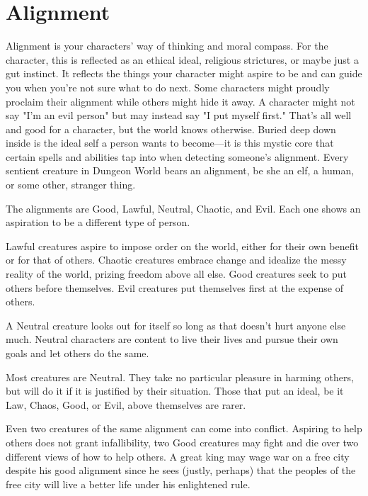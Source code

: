        
\section{Alignment}   
       

Alignment is your characters' way of thinking and moral compass. For the character, this is reflected as an ethical ideal, religious strictures, or maybe just a gut instinct. It reflects the things your character might aspire to be and can guide you when you're not sure what to do next. Some characters might proudly proclaim their alignment while others might hide it away. A character might not say "I'm an evil person" but may instead say "I put myself first." That's all well and good for a character, but the world knows otherwise. Buried deep down inside is the ideal self a person wants to become—it is this mystic core that certain spells and abilities tap into when detecting someone's alignment. Every sentient creature in Dungeon World bears an alignment, be she an elf, a human, or some other, stranger thing.

       

The alignments are Good, Lawful, Neutral, Chaotic, and Evil. Each one shows an aspiration to be a different type of person.

       

Lawful creatures aspire to impose order on the world, either for their own benefit or for that of others. Chaotic creatures embrace change and idealize the messy reality of the world, prizing freedom above all else. Good creatures seek to put others before themselves. Evil creatures put themselves first at the expense of others.

       

A Neutral creature looks out for itself so long as that doesn't hurt anyone else much. Neutral characters are content to live their lives and pursue their own goals and let others do the same.

       

Most creatures are Neutral. They take no particular pleasure in harming others, but will do it if it is justified by their situation. Those that put an ideal, be it Law, Chaos, Good, or Evil, above themselves are rarer.

       

Even two creatures of the same alignment can come into conflict. Aspiring to help others does not grant infallibility, two Good creatures may fight and die over two different views of how to help others. A great king may wage war on a free city despite his good alignment since he sees (justly, perhaps) that the peoples of the free city will live a better life under his enlightened rule.

